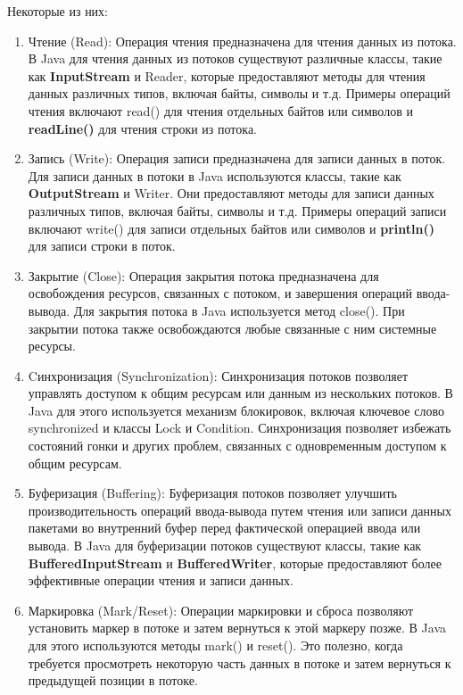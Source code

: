 \documentclass[12pt, a4paper]{book}%
\begin{document}
{Некоторые из них:

\begin{enumerate} 
\item Чтение (Read): Операция чтения предназначена для чтения данных из потока. В Java для чтения данных из потоков существуют различные классы, такие как {\bf InputStream} и Reader, которые предоставляют методы для чтения данных различных типов, включая байты, символы и т.д. Примеры операций чтения включают read() для чтения отдельных байтов или символов и {\bf readLine()} для чтения строки из потока.
\item Запись (Write): Операция записи предназначена для записи данных в поток. Для записи данных в потоки в Java используются классы, такие как {\bf OutputStream} и Writer. Они предоставляют методы для записи данных различных типов, включая байты, символы и т.д. Примеры операций записи включают write() для записи отдельных байтов или символов и {\bf println()} для записи строки в поток.
\item Закрытие (Close): Операция закрытия потока предназначена для освобождения ресурсов, связанных с потоком, и завершения операций ввода-вывода. Для закрытия потока в Java используется метод close(). При закрытии потока также освобождаются любые связанные с ним системные ресурсы.
\item Cинхронизация (Synchronization): Синхронизация потоков позволяет управлять доступом к общим ресурсам или данным из нескольких потоков. В Java для этого используется механизм блокировок, включая ключевое слово synchronized и классы Lock и Condition. Синхронизация позволяет избежать состояний гонки и других проблем, связанных с одновременным доступом к общим ресурсам.
\item Буферизация (Buffering): Буферизация потоков позволяет улучшить производительность операций ввода-вывода путем чтения или записи данных пакетами во внутренний буфер перед фактической операцией ввода или вывода. В Java для буферизации потоков существуют классы, такие как {\bf BufferedInputStream} и {\bf BufferedWriter}, которые предоставляют более эффективные операции чтения и записи данных.
\item Маркировка (Mark/Reset): Операции маркировки и сброса позволяют установить маркер в потоке и затем вернуться к этой маркеру позже. В Java для этого используются методы mark() и reset(). Это полезно, когда требуется просмотреть некоторую часть данных в потоке и затем вернуться к предыдущей позиции в потоке.
\end{enumerate}

}
\end{document}
